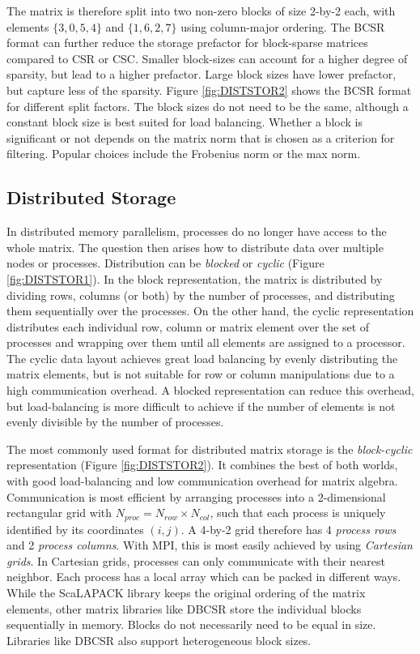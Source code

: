 \noindent The matrix is therefore split into two non-zero blocks of size 2-by-2 each, with elements $\{3,0,5,4\}$ and $\{1,6,2,7\}$ using column-major ordering. The BCSR format can further reduce the storage prefactor for block-sparse matrices compared to CSR or CSC. Smaller block-sizes can account for a higher degree of sparsity, but lead to a higher prefactor. Large block sizes have lower prefactor, but capture less of the sparsity. Figure \ref{fig:DISTSTOR2} shows the BCSR format for different split factors. The block sizes do not need to be the same, although a constant block size is best suited for load balancing. Whether a block is significant or not depends on the matrix norm that is chosen as a criterion for filtering. Popular choices include the Frobenius norm or the max norm. 

\subsection{Distributed Storage}

In distributed memory parallelism, processes do no longer have access to the whole matrix. The question then arises how to distribute data over multiple nodes or processes. Distribution can be \emph{blocked} or \emph{cyclic} (Figure \ref{fig:DISTSTOR1}). In the block representation, the matrix is distributed by dividing rows, columns (or both) by the number of processes, and distributing them sequentially over the processes. On the other hand, the cyclic representation distributes each individual row, column or matrix element over the set of processes and wrapping over them until all elements are assigned to a processor. The cyclic data layout achieves great load balancing by evenly distributing the matrix elements, but is not suitable for row or column manipulations due to a high communication overhead. A blocked representation can reduce this overhead, but load-balancing is more difficult to achieve if the number of elements is not evenly divisible by the number of processes. 

The most commonly used format for distributed matrix storage is the \emph{block-cyclic} representation (Figure \ref{fig:DISTSTOR2}). It combines the best of both worlds, with good load-balancing and low communication overhead for matrix algebra. Communication is most efficient by arranging processes into a 2-dimensional rectangular grid with $N_{proc} = N_{row} \times N_{col}$, such that each process is uniquely identified by its coordinates $(i,j)$. A 4-by-2 grid therefore has 4 \emph{process rows} and 2 \emph{process columns}. With MPI, this is most easily achieved by using \emph{Cartesian grids}. In Cartesian grids, processes can only communicate with their nearest neighbor. Each process has a local array which can be packed in different ways. While the ScaLAPACK library keeps the original ordering of the matrix elements, other matrix libraries like DBCSR store the individual blocks sequentially in memory. Blocks do not necessarily need to be equal in size. Libraries like DBCSR also support heterogeneous block sizes.

